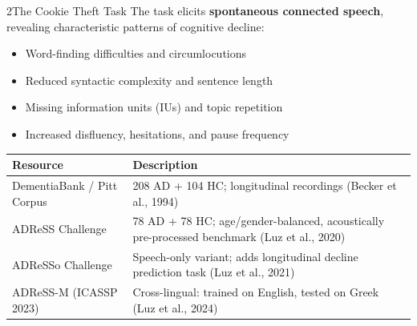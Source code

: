 \documentclass[final]{beamer}
\newlength{\leftcol}
\newlength{\blockskip}
\begin{document}
\begin{frame}[t]
\begin{columns}[T, totalwidth=\linewidth]
\begin{column}{\leftcol}
\begin{block}{2\enspace The Cookie Theft Task}
\vspace{0.5em}
\noindent The task elicits \textbf{spontaneous connected speech},
revealing characteristic patterns of cognitive decline:

\begin{itemize}[leftmargin=1.4em, itemsep=0.25em, topsep=0.3em]
  \item Word-finding difficulties and circumlocutions
  \item Reduced syntactic complexity and sentence length
  \item Missing information units (IUs) and topic repetition
  \item Increased disfluency, hesitations, and pause frequency
\end{itemize}

\vspace{0.6em}
\begin{center}
\renewcommand{\arraystretch}{1.35}
\begin{tabular}{@{}p{} p{}@{}}
  \toprule
  \rowcolor{Cprimary!15}
  \textbf{Resource} & \textbf{Description} \\
  \midrule
  DementiaBank / Pitt Corpus
    & 208 AD + 104 HC; longitudinal recordings
      (Becker et al., 1994) \\
  ADReSS Challenge
    & 78 AD + 78 HC; age/gender-balanced,
      acoustically pre-processed benchmark
      (Luz et al., 2020) \\
  ADReSSo Challenge
    & Speech-only variant; adds longitudinal
      decline prediction task
      (Luz et al., 2021) \\
  ADReSS-M (ICASSP 2023)
    & Cross-lingual: trained on English,
      tested on Greek
      (Luz et al., 2024) \\
  \bottomrule
\end{tabular}
\end{center}
\end{block}

\vspace{\blockskip}


\end{column}
\end{columns}
\end{frame}
\end{document}
